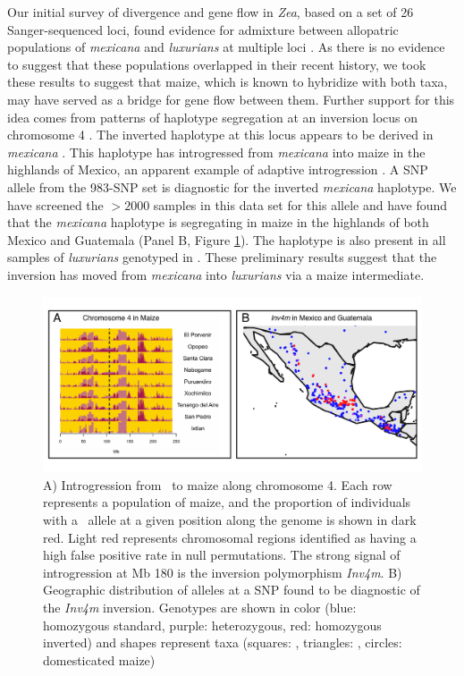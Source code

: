 Our initial survey of divergence and gene flow in \emph{Zea}, based on a set of 26 Sanger-sequenced loci, found evidence for admixture between allopatric populations of \emph{mexicana} and \emph{luxurians} at multiple loci \citep{Ross-Ibarra2009a}. 
As there is no evidence to suggest that these populations overlapped in their recent history, we took these results to suggest that maize, which is known to hybridize with both taxa, may have served as a bridge for gene flow between them.
Further support for this idea comes from patterns of haplotype segregation at an inversion locus on chromosome 4 \citep[\emph{Inv4m};][]{Fang2012,Pyhajarvi2013,Hufford2013}. 
The inverted haplotype at this locus appears to be derived in \emph{mexicana} \citep{Pyhajarvi2013}.
This haplotype has introgressed from \emph{mexicana} into maize in the highlands of Mexico, an apparent example of adaptive introgression \citep[Panel A, Figure \ref{fig:hufmap};][]{Hufford2013}.
A SNP allele from the 983-SNP set is diagnostic for the inverted \emph{mexicana} haplotype.
We have screened the $>2000$ samples in this data set for this allele and have found that the \emph{mexicana} haplotype is segregating in maize in the highlands of both Mexico and Guatemala (Panel B, Figure \ref{fig:hufmap}).  The haplotype is also present in all samples of \emph{luxurians} genotyped in \citet{Fang2012}.
These preliminary results suggest that the inversion has moved from \emph{mexicana} into \emph{luxurians} via a maize intermediate.\\

\begin{figure}[h!]
  \centering
   \includegraphics[width=1\textwidth]{inv_map.pdf}
    \caption{A) Introgression from \zm\ to maize along chromosome 4.  Each row represents a population of maize, and the proportion of individuals with a \zm\ allele at a given position along the genome is shown in dark red.  Light red represents chromosomal regions identified as having a high false positive rate in null permutations.  The strong signal of introgression at Mb 180 is the inversion polymorphism \emph{Inv4m}. B) Geographic distribution of alleles at a SNP found to be diagnostic of the \emph{Inv4m} inversion.  Genotypes are shown in color (blue: homozygous standard, purple: heterozygous, red: homozygous inverted) and shapes represent taxa (squares: \zm, triangles: \zp, circles: domesticated maize)} 
\label{fig:hufmap}
\end{figure}



